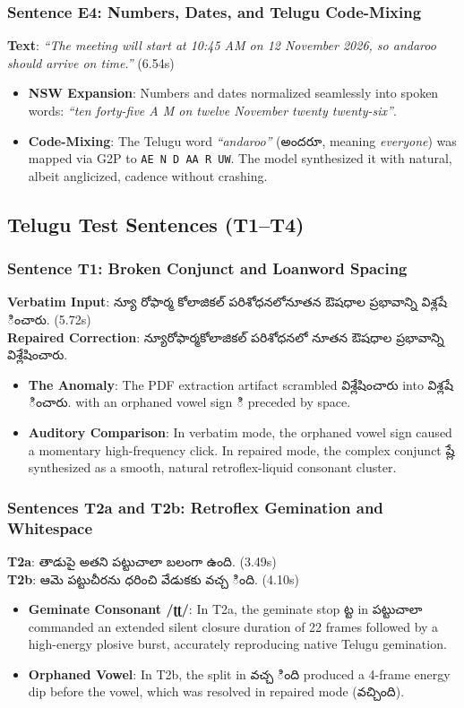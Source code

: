 \documentclass[11pt,a4paper]{article}
\newcommand{\te}[1]{{\telugufont #1}}
\begin{document}
\subsubsection{Sentence E4: Numbers, Dates, and Telugu Code-Mixing}
\textbf{Text}: \textit{``The meeting will start at 10:45 AM on 12 November 2026, so andaroo should arrive on time.''} (6.54s)
\begin{itemize}
  \item \textbf{NSW Expansion}: Numbers and dates normalized seamlessly into spoken words: \textit{``ten forty-five A M on twelve November twenty twenty-six''}.
  \item \textbf{Code-Mixing}: The Telugu word \textit{``andaroo''} (\te{అందరూ}, meaning \textit{everyone}) was mapped via G2P to \texttt{AE N D AA R UW}. The model synthesized it with natural, albeit anglicized, cadence without crashing.
\end{itemize}

\subsection{Telugu Test Sentences (T1--T4)}

\subsubsection{Sentence T1: Broken Conjunct and Loanword Spacing}
\textbf{Verbatim Input}: \te{న్యూ రోఫార్మ కోలాజికల్ పరిశోధనలోనూతన ఔషధాల ప్రభావాన్ని విశ్లషే ించారు.} (5.72s) \\
\textbf{Repaired Correction}: \te{న్యూరోఫార్మకోలాజికల్ పరిశోధనలో నూతన ఔషధాల ప్రభావాన్ని విశ్లేషించారు.}
\begin{itemize}
  \item \textbf{The Anomaly}: The PDF extraction artifact scrambled \te{విశ్లేషించారు} into \te{విశ్లషే ించారు.} with an orphaned vowel sign \te{ి} preceded by space.
  \item \textbf{Auditory Comparison}: In verbatim mode, the orphaned vowel sign caused a momentary high-frequency click. In repaired mode, the complex conjunct \te{ష్లే} synthesized as a smooth, natural retroflex-liquid consonant cluster.
\end{itemize}

\subsubsection{Sentences T2a and T2b: Retroflex Gemination and Whitespace}
\textbf{T2a}: \te{తాడుపై అతని పట్టుచాలా బలంగా ఉంది.} (3.49s) \\
\textbf{T2b}: \te{ఆమె పట్టుచీరను ధరించి వేడుకకు వచ్చ ింది.} (4.10s)
\begin{itemize}
  \item \textbf{Geminate Consonant /ʈʈ/}: In T2a, the geminate stop \te{ట్ట} in \te{పట్టుచాలా} commanded an extended silent closure duration of 22 frames followed by a high-energy plosive burst, accurately reproducing native Telugu gemination.
  \item \textbf{Orphaned Vowel}: In T2b, the split in \te{వచ్చ ింది} produced a 4-frame energy dip before the vowel, which was resolved in repaired mode (\te{వచ్చింది}).
\end{itemize}
\end{document}
